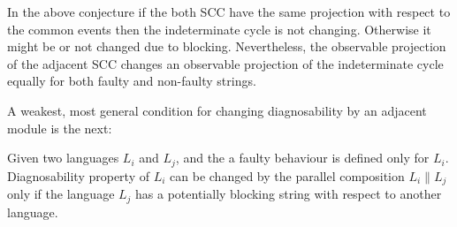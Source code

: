 \documentclass[a4paper, 10pt, conference]{ieeeconf}
\begin{document}
In the above conjecture if the both SCC have the same projection with respect to
the common events then the indeterminate cycle is not changing. Otherwise it
might be or not changed due to blocking. Nevertheless, the observable
projection of the adjacent SCC changes an observable projection of
the indeterminate cycle equally for both faulty and non-faulty strings.

A weakest, most general condition for changing diagnosability by an
adjacent module is the next:

\begin{conjecture} Given two
languages $L_i$ and $L_j$, and the a faulty behaviour is defined only for $L_i$.
Diagnosability property of $L_i$ can be changed by the parallel composition $L_i
\parallel L_j$ only if the language $L_j$ has a potentially blocking string with
respect to another language.
\end{conjecture}






\end{document}
